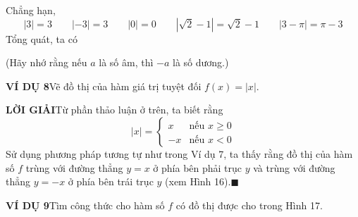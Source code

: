 \begin{minipage}[t]{0.708\textwidth}
    \fontsize{8.8pt}{11.5pt}\selectfont
    \noindent
    Chẳng hạn,
    \[
    |3| = 3 \qquad |-3| = 3 \qquad |0| = 0 \qquad |\sqrt{2} - 1| = \sqrt{2} - 1 \qquad |3 - \pi| = \pi - 3
    \]
    Tổng quát, ta có
    \begin{center}
    \fboxrule=0.7pt\relax
    \end{center}
    (Hãy nhớ rằng nếu $a$ là số âm, thì $-a$ là số dương.)

    \vspace{3pt}
    \noindent
    \textbf{\textsf{\color{stewartcyan}VÍ DỤ 8}}\quad Vẽ đồ thị của hàm giá trị tuyệt đối $f(x) = |x|$.

    \vspace{3pt}
    \noindent
    \textbf{\textsf{\color{stewartcyan}LỜI GIẢI}}\quad Từ phần thảo luận ở trên, ta biết rằng
    \[
    |x| = \begin{cases}
    x & \text{nếu } x \geqslant 0 \\
    -x & \text{nếu } x < 0
    \end{cases}
    \]
    Sử dụng phương pháp tương tự như trong Ví dụ 7, ta thấy rằng đồ thị của hàm số $f$ trùng với đường thẳng $y = x$ ở phía bên phải trục $y$ và trùng với đường thẳng $y = -x$ ở phía bên trái trục $y$ (xem Hình 16).\hfill{\color{stewartcyan}$\blacksquare$}

    \vspace{3pt}
    \noindent
    \textbf{\textsf{\color{stewartcyan}VÍ DỤ 9}}\quad Tìm công thức cho hàm số $f$ có đồ thị được cho trong Hình 17.


\end{minipage}
